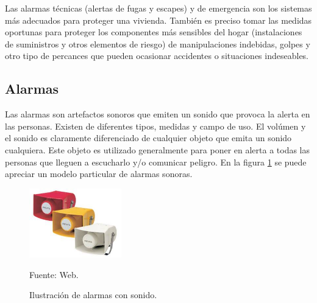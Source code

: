 Las alarmas técnicas (alertas de fugas y escapes) y de emergencia son los sistemas más adecuados para proteger una vivienda. También es preciso tomar las medidas oportunas para proteger los componentes más sensibles del hogar (instalaciones de suministros y otros elementos de riesgo) de manipulaciones indebidas, golpes y otro tipo de percances que pueden ocasionar accidentes o situaciones indeseables.

\subsection{Alarmas}

Las alarmas son artefactos sonoros que emiten un sonido que provoca la alerta en las personas. Existen de diferentes tipos, medidas y campo de uso. El volúmen y el sonido es claramente diferenciado de cualquier objeto que emita un sonido cualquiera. Este objeto es utilizado generalmente para poner en alerta a todas las personas que lleguen a escucharlo y/o comunicar peligro.
En la figura \ref{fig:bocinas} se puede apreciar un modelo particular de alarmas sonoras.

\begin{figure}[H]
    \begin{center}
        \includegraphics[width=4cm]{img/capitulo_3/alarmas.jpg}
        \caption{Ilustración de alarmas con sonido.}
        Fuente: Web.
        \label{fig:bocinas}
    \end{center}
\end{figure}


